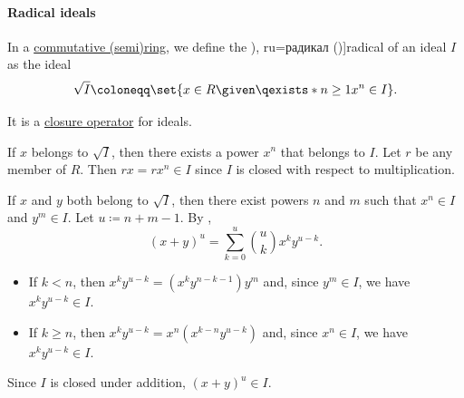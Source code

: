 \paragraph{Radical ideals}

\begin{definition}\label{def:radical_of_ideal}
  In a \hyperref[def:ring/commutative]{commutative (semi)ring}, we define the \term[bg=радикал (\cite[15]{КоцевСидеров2016КомутативнаАлгебра}), ru=радикал (\cite[173]{Ленг1968Алгебра})]{radical} of an ideal \( I \) as the ideal
  \begin{equation}\label{eq:def:radical_ideal}
    \sqrt I \coloneqq \set{ x \in R \given \qexists* {n \geq 1} x^n \in I }.
  \end{equation}

  It is a \hyperref[def:abstract_closure_operator]{closure operator} for ideals.
\end{definition}
\begin{defproof}

   If \( x \) belongs to \( \sqrt I \), then there exists a power \( x^n \) that belongs to \( I \). Let \( r \) be any member of \( R \). Then \( rx = rx^n \in I \) since \( I \) is closed with respect to multiplication.

   If \( x \) and \( y \) both belong to \( \sqrt I \), then there exist powers \( n \) and \( m \) such that \( x^n \in I \) and \( y^m \in I \). Let \( u \coloneqq n + m - 1 \). By ,
  \begin{equation*}
    (x + y)^u = \sum_{k=0}^u \binom u k x^k y^{u-k}.
  \end{equation*}

  \begin{itemize}
    \item If \( k < n \), then \( x^k y^{u-k} = (x^k y^{n - k - 1}) y^m \) and, since \( y^m \in I \), we have \( x^k y^{u-k} \in I \).
    \item If \( k \geq n \), then \( x^k y^{u-k} = x^n (x^{k-n} y^{u-k}) \) and, since \( x^n \in I \), we have \( x^k y^{u-k} \in I \).
  \end{itemize}

  Since \( I \) is closed under addition, \( (x + y)^u \in I \).
\end{defproof}

